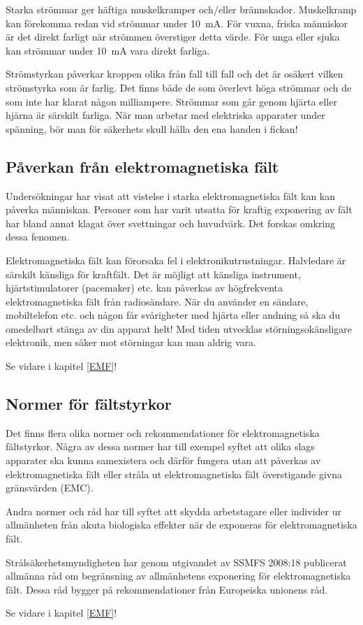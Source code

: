 Starka strömmar ger häftiga muskelkramper och/eller brännskador.
Muskelkramp kan förekomma redan vid strömmar under 10~mA.
För vuxna, friska människor är det direkt farligt när strömmen överstiger
detta värde.
För unga eller sjuka kan strömmar under 10~mA vara direkt farliga.

Strömstyrkan påverkar kroppen olika från fall till fall och det är osäkert
vilken strömstyrka som är farlig.
Det finns både de som överlevt höga strömmar och de som inte har klarat någon
milliampere.
Strömmar som går genom hjärta eller hjärna är särskilt farliga.
När man arbetar med elektriska apparater under spänning, bör man för säkerhets
skull hålla den ena handen i fickan!

\subsection{Påverkan från elektromagnetiska fält}

Undersökningar har visat att vistelse i starka elektromagnetiska fält
kan kan påverka människan.
Personer som har varit utsatta för kraftig exponering av fält har bland annat
klagat över svettningar och huvudvärk.
Det forskas omkring dessa fenomen.

Elektromagnetiska fält kan förorsaka fel i elektronikutrustningar.
Halvledare är särskilt känsliga för kraftfält.
Det är möjligt att känsliga instrument, hjärtstimulatorer (pacemaker) etc. kan
påverkas av högfrekventa elektromagnetiska fält från radiosändare.
När du använder en sändare, mobiltelefon etc. och någon får svårigheter med
hjärta eller andning så ska du omedelbart stänga av din apparat helt!
Med tiden utvecklas störningsokänsligare elektronik, men säker mot störningar
kan man aldrig vara.

Se vidare i kapitel \ref{EMF}!

\subsection{Normer för fältstyrkor}

Det finns flera olika normer och rekommendationer för elektromagnetiska
fältstyrkor. Några av dessa normer har till exempel syftet att olika slags
apparater ska kunna samexistera och därför fungera utan att påverkas av
elektromagnetiska fält eller stråla ut elektromagnetiska fält överstigande
givna gränsvärden (EMC).

Andra normer och råd har till syftet att skydda arbetstagare eller individer
ur allmänheten från akuta biologiska effekter när de exponeras för
elektromagnetiska fält.

Strålsäkerhetsmyndigheten har genom utgivandet av SSMFS 2008:18 publicerat
allmänna råd om begränsning av allmänhetens exponering för elektromagnetiska
fält.
Dessa råd bygger på rekommendationer från Europeiska unionens råd.

Se vidare i kapitel \ref{EMF}!

